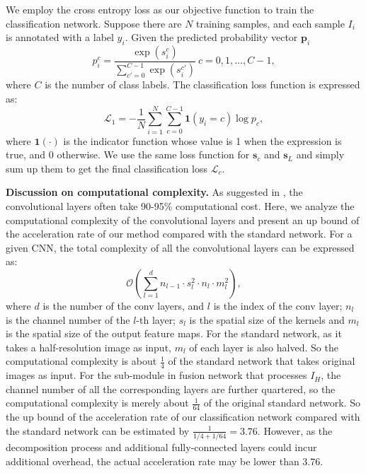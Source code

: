 \documentclass[letterpaper]{article} %
\begin{document}
We employ the cross entropy loss as our objective function to train the classification network. Suppose there are $N$ training samples, and each sample $I_i$ is annotated with a label $y_i$. 
Given the predicted probability vector $\mathbf{p}_i$
 \begin{equation}
      p_{i}^c= \frac{\exp(s_{i}^c)}{\sum_{c'=0}^{C-1}\exp(s_{i}^{c'})} \ c=0,1,\dots,C-1,
\end{equation}
where $C$ is the number of class labels. The classification loss function is expressed as:
 \begin{equation}
      \mathcal{L}_{{1}}=-\frac{1}{N}\sum_{i=1}^N\sum_{c=0}^{C-1}\mathbf{1}(y_i=c)\log{p_c},
\end{equation}
where $\mathbf{1}(\cdot)$ is the indicator function whose value is 1 when the expression is true, and 0 otherwise. We use the same loss function for $\mathbf{s}_c$ and $\mathbf{s}_L$ and simply sum up them to get the final classification loss $\mathcal{L}_c$. 

\noindent\textbf{Discussion on computational complexity. } As suggested in \cite{he2015convolutional}, the convolutional layers often take 90-95\% computational cost. Here, we analyze the computational complexity of the convolutional layers and present an up bound of the acceleration rate of our method compared with the standard network. For a given CNN, the total complexity of all the convolutional layers can be expressed as:  
\begin{equation} 
   \mathcal{O}(\sum_{l=1}^{d}n_{l-1} \cdot s_l^2 \cdot n_l \cdot m_l^2),
\end{equation}
where $d$ is the number of the conv layers, and $l$ is the index of the conv layer; $n_l$ is the channel number of the $l$-th layer; $s_l$ is the spatial size of the kernels and $m_l$ is the spatial size of the output feature maps. For the standard network, as it takes a half-resolution image as input, $m_l$ of each layer is also halved. So the computational complexity is about $\frac{1}{4}$ of the standard network that takes original images as input. For the sub-module in fusion network that processes $I_H$, the channel number of all the corresponding layers are further quartered, so the computational complexity is merely about $\frac{1}{64}$ of the original standard network. So the up bound of the acceleration rate of our classification network compared with the standard network can be estimated by $\frac{1} {1/4 + 1/64}=3.76$. However, as the decomposition process and additional fully-connected layers could incur additional overhead, the actual acceleration rate may be lower than 3.76.
\end{document}
